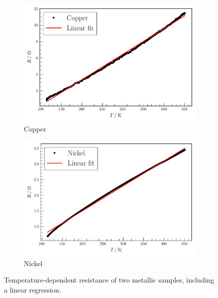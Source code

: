 \begin{figure}
    \centering
\begin{subfigure}{.45\textwidth}
    \centering
    \includegraphics[width=\textwidth]{plots/R2.pdf}
    \caption{Copper}
    \label{fig:Cu}
\end{subfigure}
\begin{subfigure}{.45\textwidth}
    \centering
    \includegraphics[width=\textwidth]{plots/R3.pdf}
  \caption{Nickel}
    \label{fig:Ni}
\end{subfigure}
\caption{Temperature-dependent resistance of two metallic samples, including a linear regression.}
\label{fig:metallic-fit}
\end{figure}


